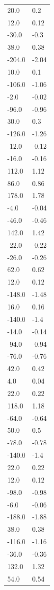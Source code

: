 \begin{longtable}{ll}
20.0 & 0.2 \\
12.0 & 0.12 \\
-30.0 & -0.3 \\
38.0 & 0.38 \\
-204.0 & -2.04 \\
10.0 & 0.1 \\
-106.0 & -1.06 \\
-2.0 & -0.02 \\
-96.0 & -0.96 \\
30.0 & 0.3 \\
-126.0 & -1.26 \\
-12.0 & -0.12 \\
-16.0 & -0.16 \\
112.0 & 1.12 \\
86.0 & 0.86 \\
178.0 & 1.78 \\
-4.0 & -0.04 \\
-46.0 & -0.46 \\
142.0 & 1.42 \\
-22.0 & -0.22 \\
-26.0 & -0.26 \\
62.0 & 0.62 \\
12.0 & 0.12 \\
-148.0 & -1.48 \\
16.0 & 0.16 \\
-140.0 & -1.4 \\
-14.0 & -0.14 \\
-94.0 & -0.94 \\
-76.0 & -0.76 \\
42.0 & 0.42 \\
4.0 & 0.04 \\
22.0 & 0.22 \\
118.0 & 1.18 \\
-64.0 & -0.64 \\
50.0 & 0.5 \\
-78.0 & -0.78 \\
-140.0 & -1.4 \\
22.0 & 0.22 \\
12.0 & 0.12 \\
-98.0 & -0.98 \\
-6.0 & -0.06 \\
-188.0 & -1.88 \\
38.0 & 0.38 \\
-116.0 & -1.16 \\
-36.0 & -0.36 \\
132.0 & 1.32 \\
54.0 & 0.54 \\

\end{longtable}
